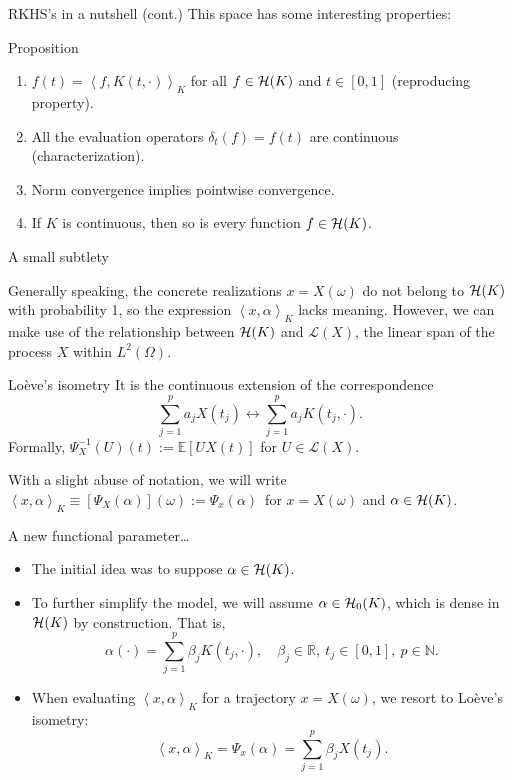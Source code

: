 \documentclass[9pt, english, professionalfonts]{beamer}
\newcommand\maroon[1]{\color{mLightBrown}#1\color{mDarkTeal}}
\newcommand{\N} {\ensuremath{\mathds{N}}}
\newcommand{\R} {\ensuremath{\mathds{R}}}
\newcommand{\E} {\ensuremath{\mathds{E}}}
\newcommand{\Lcal} {\ensuremath{\mathcal{L}}}
\newcommand{\Hcal} {\ensuremath\mathcal{H}}
\newcommand\dotprod[2]{\left\langle #1, #2 \right\rangle}
\begin{document}
\begin{frame}{RKHS's in a nutshell (cont.)}
  This space has some interesting properties:

  \vspace{1em}

  \begin{block}{Proposition}
    \begin{enumerate}
      \item \(f(t) = \dotprod{f}{K(t, \cdot)}_K\) for all \(f\in\Hcal(K)\) and \(t \in [0,1]\) \maroon{(reproducing property)}.
      \item All the evaluation operators \(\delta_t(f)=f(t)\) are continuous \maroon{(characterization)}.
      \item Norm convergence implies pointwise convergence.
      \item If \(K\) is continuous, then so is every function \(f\in\Hcal(K)\).
    \end{enumerate}
  \end{block}
\end{frame}

\begin{frame}{A small subtlety}

  Generally speaking, the concrete realizations \(x=X(\omega)\) \maroon{do not belong to \(\Hcal(K)\) with probability 1}, so the expression \(\dotprod{x}{\alpha}_K\) lacks meaning. However, we can make use of the relationship between \(\Hcal(K)\) and \(\Lcal(X)\), the linear span of the process \(X\) within \(L^2(\Omega)\).

  \vspace{1em}
  \begin{block}{Loève's isometry}
    It is the continuous extension of the correspondence
    \[
\sum_{j=1}^p a_j X(t_j) \longleftrightarrow \sum_{j=1}^p a_j K(t_j, \cdot).
    \]
    Formally, \(\Psi^{-1}_X(U)(t) := \E[U X(t)]\) for \(U \in \Lcal(X)\).
  \end{block}
  With a slight abuse of notation, we will write \maroon{\(\dotprod{x}{\alpha}_K \equiv [\Psi_X(\alpha)](\omega) := \Psi_x(\alpha)\)}\ for \(x=X(\omega)\) and \(\alpha \in \Hcal(K)\).
\end{frame}

\begin{frame}{A new functional parameter\ldots}
  \begin{itemize}
    \item The initial idea was to suppose \(\alpha \in \Hcal(K)\).
    \item To further simplify the model, we will assume \(\alpha \in \Hcal_0(K)\), which is dense in \(\Hcal(K)\) by construction. That is,
    \[
      \alpha(\cdot) = \sum_{j=1}^p \beta_j K(t_j, \cdot), \quad \beta_j \in \R, \ t_j \in [0, 1], \ p \in \N.
    \]
    \item When evaluating \(\dotprod{x}{\alpha}_K\) for a trajectory \(x=X(\omega)\), we resort to Loève's isometry:
    \[
      \dotprod{x}{\alpha}_K = \Psi_x(\alpha) = \sum_{j=1}^p \beta_j X(t_j).
    \]
  \end{itemize}

\end{frame}
\end{document}
